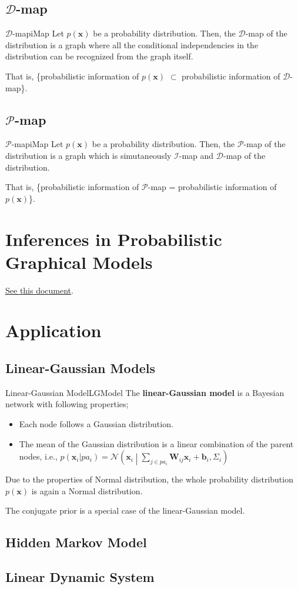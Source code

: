\documentclass{article}
\begin{document}
    \subsection{$\mathcal D$-map}
        \begin{defn}{$\mathcal D$-map}{iMap}
            Let $p(\mathbf{x})$ be a probability distribution. Then, the $\mathcal D$-map of the
            distribution is a graph where all the conditional independencies in the distribution
            can be recognized from the graph itself.
        \end{defn}
        That is, \{probabilistic information of $p(\mathbf{x})$ $\subset$ probabilistic information of $\mathcal D$-map\}.
    \subsection{$\mathcal P$-map}
        \begin{defn}{$\mathcal P$-map}{iMap}
            Let $p(\mathbf{x})$ be a probability distribution. Then, the $\mathcal P$-map of the
            distribution is a graph which is simutaneously $\mathcal I$-map and $\mathcal D$-map
            of the distribution.
        \end{defn}
        That is, \{probabilistic information of $\mathcal P$-map = probabilistic information of $p(\mathbf{x})$\}.

\section{Inferences in Probabilistic Graphical Models}
    \href{run:../../inference/exact_inference/exact_inference.pdf}{See this document}.

\section{Application}
    \subsection{Linear-Gaussian Models}
        \begin{defn}{Linear-Gaussian Model}{LGModel}
            The \textbf{linear-Gaussian model} is a Bayesian network with following properties;
            \begin{itemize}
                \item Each node follows a Gaussian distribution.
                \item The mean of the Gaussian distribution is a linear combination of the parent nodes, i.e.,
                    $p(\mathbf{x}_i|pa_i)=\mathcal N \left(\textbf{x}_i \middle| \sum_{j \in pa_i}\mathbf{W}_{ij}\mathbf{x}_i + \mathbf{b}_i, \Sigma_i\right)$
            \end{itemize}
            Due to the properties of Normal distribution, the whole probability distribution $p(\textbf{x})$ is again a Normal distribution.
        \end{defn}
        The conjugate prior is a special case of the linear-Gaussian model.
    \subsection{Hidden Markov Model}
    \subsection{Linear Dynamic System} 
\end{document}

